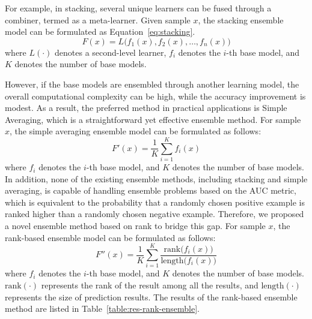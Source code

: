 \documentclass{article}
\begin{document}
For example, in stacking, several unique learners can be fused through a combiner, termed as a meta-learner. Given sample $x$, the stacking ensemble model can be formulated as Equation~\ref{eq:stacking}.
%
\begin{equation}
  F(x) = L\big(f_1(x), f_2(x), \ldots, f_n(x)\big)
  \label{eq:stacking}
\end{equation}
%
where $L(\cdot)$ denotes a second-level learner, $f_i$ denotes the $i$-th base model, and $K$ denotes the number of base models.

However, if the base models are ensembled through another learning model, the overall computational complexity can be high, while the accuracy improvement is modest. As a result, the preferred method in practical applications is Simple Averaging, which is a straightforward yet effective ensemble method. For sample $x$, the simple averaging ensemble model can be formulated as follows:
%
\begin{equation}
  F'(x) = \frac{1}{K} \sum_{i=1}^K {f_i(x)}
\end{equation}
%
where $f_i$ denotes the $i$-th base model, and $K$ denotes the number of base models.
In addition, none of the existing ensemble methods, including stacking and simple averaging, is capable of handling ensemble problems based on the AUC metric, which is equivalent to the probability that a randomly chosen positive example is ranked higher than a randomly chosen negative example. Therefore, we proposed a novel ensemble method based on rank to bridge this gap. For sample $x$, the rank-based ensemble model can be formulated as follows:
%
\begin{equation}
  F''(x) = \frac{1}{K} \sum_{i=1}^K \frac{\text{rank}\big( f_i(x) \big)}{\text{length}\big( f_i(x) \big)}
\end{equation}
%
where $f_i$ denotes the $i$-th base model, and $K$ denotes the number of base models. $\text{rank}(\cdot)$ represents the rank of the result among all the results, and $\text{length}(\cdot)$ represents the size of prediction results. The results of the rank-based ensemble method are listed in Table~\ref{table:res-rank-ensemble}.
\end{document}
